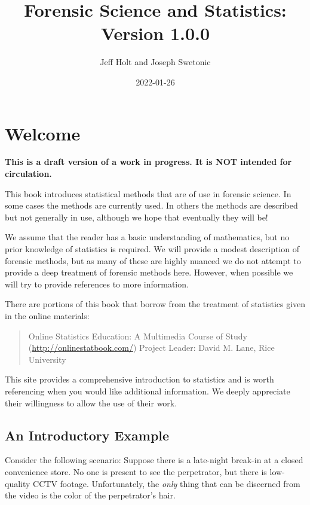 \documentclass[
]{book}
\title{Forensic Science and Statistics: Version 1.0.0}
\author{Jeff Holt and Joseph Swetonic}
\date{2022-01-26}
\begin{document}
\maketitle

{
\setcounter{tocdepth}{1}
\tableofcontents
}
\hypertarget{welcome}{%
\chapter{Welcome}\label{welcome}}

\textbf{This is a draft version of a work in progress. It is NOT intended for circulation.}

This book introduces statistical methods that are of use in forensic science.
In some cases the methods are currently used.
In others the methods are described but not generally in use,
although we hope that eventually they will be!

We assume that the reader has a basic understanding of mathematics, but no prior
knowledge of statistics is required.
We will provide a modest description of forensic methods, but as many of these are
highly nuanced we do not attempt to
provide a deep treatment of forensic methods here. However, when possible we will
try to provide references to more information.

There are portions of this book that borrow from the treatment of statistics
given in the online materials:

\begin{quote}
Online Statistics Education: A Multimedia Course of Study (\url{http://onlinestatbook.com/})
Project Leader: David M. Lane, Rice University
\end{quote}

This site provides a comprehensive introduction to statistics and is worth referencing when you would like additional information.
We deeply appreciate their willingness to allow the use of their work.

\hypertarget{an-introductory-example}{%
\section{An Introductory Example}\label{an-introductory-example}}

Consider the following scenario:
Suppose there is a late-night break-in at a closed convenience store.
No one is present to see the perpetrator, but there is low-quality CCTV footage.
Unfortunately, the \emph{only} thing that can be discerned from the video is the
color of the perpetrator's hair.
\end{document}
